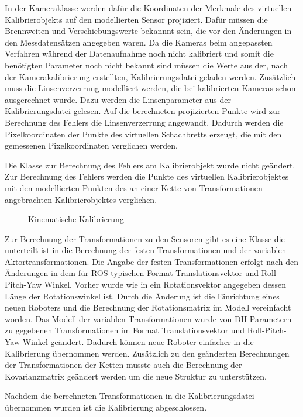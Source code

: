In der Kameraklasse werden dafür die Koordinaten der Merkmale des virtuellen 
Kalibrierobjekts auf den modellierten Sensor projiziert. Dafür müssen die
Brennweiten und Verschiebungswerte bekannnt sein, die vor den Änderungen in den
Messdatensätzen angegeben waren. Da die Kameras beim angepassten Verfahren 
während der Datenaufnahme noch nicht kalibriert und somit die benötigten 
Parameter noch nicht bekannt sind müssen die Werte aus der, nach der
Kamerakalibrierung erstellten, Kalibrierungsdatei geladen werden. 
Zusätzlich muss die Linsenverzerrung modelliert werden, die bei kalibrierten 
Kameras schon ausgerechnet wurde. Dazu werden die Linsenparameter aus der 
Kalibrierungsdatei gelesen. Auf die berechneten projizierten Punkte wird zur 
Berechnung des Fehlers die Linsenverzerrung angewandt. Dadurch werden
die Pixelkoordinaten der Punkte des virtuellen Schachbretts erzeugt, die mit 
den gemessenen Pixelkoordinaten verglichen werden.

Die Klasse zur Berechnung des Fehlers am Kalibrierobjekt wurde nicht geändert.
Zur Berechnung des Fehlers werden die Punkte des virtuellen Kalibrierobjektes
mit den modellierten Punkten des an einer Kette von Transformationen angebrachten
Kalibrierobjektes verglichen.

\begin{figure}[htpb]
  \centering

    \label{fig:run_calibration}
    \caption{Kinematische Kalibrierung}
\end{figure}

Zur Berechnung der Transformationen zu den Sensoren gibt es eine Klasse die 
unterteilt ist in die Berechnung der festen Transformationen und der variablen
Aktortransformationen. Die Angabe der festen Transformationen erfolgt nach den
Änderungen in dem für \ac{ROS} typischen Format Translationsvektor und
Roll-Pitch-Yaw Winkel. Vorher wurde wie in \cite[Abschnitt 3.3.2]{pr2_estimation}
ein Rotationsvektor angegeben dessen Länge der Rotationswinkel ist. 
Durch die Änderung ist die Einrichtung eines neuen Roboters und die Berechnung
der Rotationsmatrix im Modell vereinfacht worden. 
Das Modell der variablen Transformationen wurde von \ac{DH-Parameter}n zu
gegebenen Transformationen im Format Translationsvektor und 
Roll-Pitch-Yaw Winkel geändert. Dadurch können neue Roboter einfacher in die 
Kalibrierung übernommen werden. 
Zusätzlich zu den geänderten Berechnungen der Transformationen der Ketten musste
auch die Berechnung der Kovarianzmatrix geändert werden um die neue Struktur zu 
unterstützen. 

Nachdem die berechneten Transformationen in die Kalibrierungsdatei übernommen 
wurden ist die Kalibrierung abgeschlossen.

